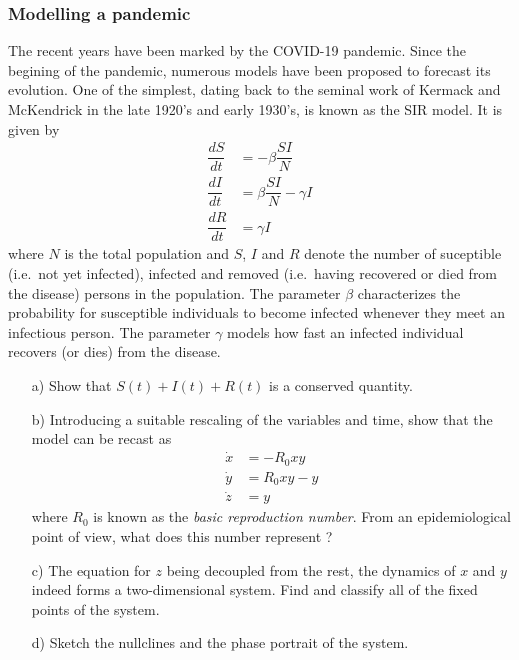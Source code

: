 \subsubsection*{Modelling a pandemic}

\begin{problem}
  The recent years have been marked by the COVID-19 pandemic.
  Since the begining of the pandemic, numerous models have been proposed to forecast its evolution.
  One of the simplest, dating back to the seminal work of Kermack and McKendrick in the late 1920's and early 1930's, is known as the SIR model.
  It is given by
  \[
  \begin{aligned}
    \dfrac{dS}{dt} & = -\beta \dfrac{SI}{N} \\
    \dfrac{dI}{dt} & = \beta \dfrac{SI}{N} - \gamma I \\
    \dfrac{dR}{dt} & = \gamma I
  \end{aligned}
  \]
  where $N$ is the total population and $S$, $I$ and $R$ denote the number of suceptible (i.e.\ not yet infected), infected and removed (i.e.\ having recovered or died from the disease) persons in the population.
  The parameter $\beta$ characterizes the probability for susceptible individuals to become infected whenever they meet an infectious person.
  The parameter $\gamma$ models how fast an infected individual recovers (or dies) from the disease.

  \begin{enumerate}
  \item[a)] Show that $S(t) + I(t) + R(t)$ is a conserved quantity.

  \item[b)] Introducing a suitable rescaling of the variables and time, show that the model can be recast as
    \[
    \begin{aligned}
      \dot{x} & = -R_0 xy \\
      \dot{y} & = R_0 xy - y \\
      \dot{z} & = y
    \end{aligned}
    \]
    where $R_0$ is known as the \emph{basic reproduction number}.
    From an epidemiological point of view, what does this number represent ?

  \item[c)] The equation for $z$ being decoupled from the rest, the dynamics of $x$ and $y$ indeed forms a two-dimensional system.
    Find and classify all of the fixed points of the system.

  \item[d)] Sketch the nullclines and the phase portrait of the system.


\end{enumerate}
\end{problem}
